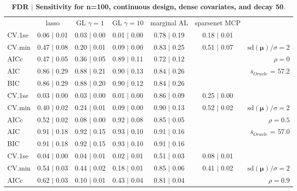 \clearpage
\begin{table}\vspace{-.5cm}
\caption[l]{ {\it }
{ \bf FDR $\boldsymbol{\mid}$ Sensitivity for n=100, continuous design, dense covariates, and  decay  50}.}
\vspace{-.5cm}
\footnotesize{}
\begin{center}
\begin{tabular}{l*{5}{c}|r}
 & lasso & GL $\gamma=1$ & GL $\gamma=10$ & marginal AL & sparsenet MCP  & \\
 \cline{1-7}
CV.1se & 0.06 $\mid$ 0.01 & 0.03 $\mid$ 0.00 & 0.01 $\mid$ 0.00 & 0.78 $\mid$ 0.19 & 0.18 $\mid$ 0.01 & \\
CV.min & 0.47 $\mid$ 0.08 & 0.20 $\mid$ 0.01 & 0.09 $\mid$ 0.00 & 0.83 $\mid$ 0.25 & 0.51 $\mid$ 0.07 &  $\mathrm{sd}(\mathbf{\mu})/\sigma=2$ \\
AICc & 0.47 $\mid$ 0.05 & 0.36 $\mid$ 0.05 & 0.89 $\mid$ 0.11 & 0.72 $\mid$ 0.12 & & $\rho=0$ \\
AIC & 0.86 $\mid$ 0.29 & 0.88 $\mid$ 0.21 & 0.90 $\mid$ 0.13 & 0.84 $\mid$ 0.26 & &  \multirow{2}{*}{$\bar{s}_{Oracle}$ = 57.2} \\
BIC & 0.86 $\mid$ 0.29 & 0.88 $\mid$ 0.20 & 0.90 $\mid$ 0.12 & 0.84 $\mid$ 0.26 & &  \\
 \hline 
CV.1se & 0.03 $\mid$ 0.00 & 0.03 $\mid$ 0.00 & 0.01 $\mid$ 0.00 & 0.86 $\mid$ 0.09 & 0.25 $\mid$ 0.00 & \\
CV.min & 0.40 $\mid$ 0.02 & 0.24 $\mid$ 0.01 & 0.09 $\mid$ 0.00 & 0.90 $\mid$ 0.13 & 0.52 $\mid$ 0.02 &  $\mathrm{sd}(\mathbf{\mu})/\sigma=2$ \\
AICc & 0.52 $\mid$ 0.02 & 0.08 $\mid$ 0.00 & 0.92 $\mid$ 0.08 & 0.85 $\mid$ 0.05 & & $\rho=0.5$ \\
AIC & 0.91 $\mid$ 0.18 & 0.92 $\mid$ 0.15 & 0.93 $\mid$ 0.10 & 0.91 $\mid$ 0.16 & &  \multirow{2}{*}{$\bar{s}_{Oracle}$ = 57.0} \\
BIC & 0.91 $\mid$ 0.18 & 0.92 $\mid$ 0.15 & 0.93 $\mid$ 0.10 & 0.91 $\mid$ 0.16 & &  \\
 \hline 
CV.1se & 0.04 $\mid$ 0.00 & 0.04 $\mid$ 0.01 & 0.02 $\mid$ 0.01 & 0.51 $\mid$ 0.03 & 0.08 $\mid$ 0.01 & \\
CV.min & 0.54 $\mid$ 0.03 & 0.44 $\mid$ 0.02 & 0.18 $\mid$ 0.01 & 0.85 $\mid$ 0.06 & 0.41 $\mid$ 0.02 &  $\mathrm{sd}(\mathbf{\mu})/\sigma=2$ \\
AICc & 0.62 $\mid$ 0.03 & 0.10 $\mid$ 0.01 & 0.43 $\mid$ 0.04 & 0.81 $\mid$ 0.04 & & $\rho=0.9$ \\

\end{tabular}
\end{center}
\end{table}
